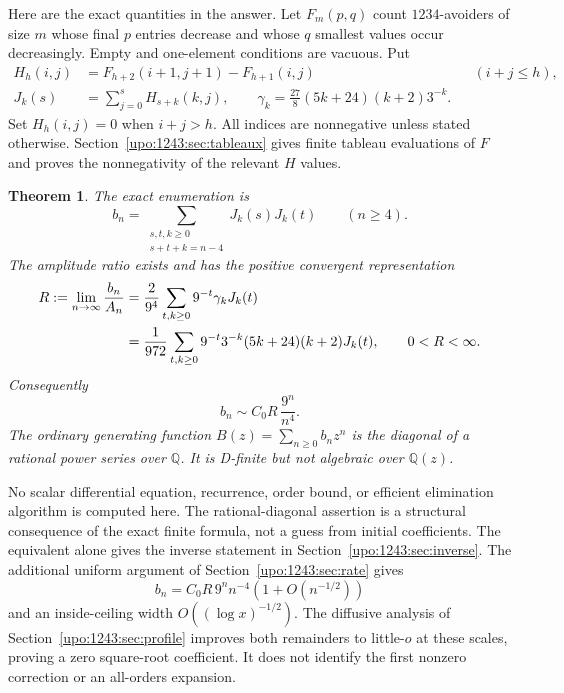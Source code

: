 \documentclass[11pt,letterpaper]{article}
\newtheorem{theorem}{Theorem}[section]
\theoremstyle{remark}\newtheorem{remark}[theorem]{Remark}
\numberwithin{equation}{section}
\begin{document}
Here are the exact quantities in the answer. Let $F_m(p,q)$ count
$1234$-avoiders of size $m$ whose final $p$ entries decrease and whose
$q$ smallest values occur decreasingly. Empty and one-element conditions
are vacuous. Put
\begin{align}
 H_h(i,j)&=F_{h+2}(i+1,j+1)-F_{h+1}(i,j)
       &&(i+j\le h),\label{upo:1243:eq:H}\\
 J_k(s)&=\sum_{j=0}^s H_{s+k}(k,j),\qquad
 \gamma_k=\frac{27}{8}(5k+24)(k+2)3^{-k}.\label{upo:1243:eq:Jdef}
\end{align}
Set $H_h(i,j)=0$ when $i+j>h$. All indices are nonnegative unless stated
otherwise. Section~\ref{upo:1243:sec:tableaux} gives finite tableau evaluations of
$F$ and proves the nonnegativity of the relevant $H$ values.

\begin{theorem}\label{upo:1243:thm:main}
The exact enumeration is
\begin{equation}\label{upo:1243:eq:spine}
 b_n=\sum_{\substack{s,t,k\ge0\\s+t+k=n-4}}J_k(s)J_k(t)
 \qquad(n\ge4).
\end{equation}
The amplitude ratio exists and has the positive convergent representation
\begin{align}
 R:=\lim_{n\to\infty}\frac{b_n}{A_n}
 &=\frac2{9^4}\sum_{t,k\ge0}9^{-t}\gamma_kJ_k(t)\label{upo:1243:eq:amplitude}\\
 &=\frac1{972}\sum_{t,k\ge0}9^{-t}3^{-k}(5k+24)(k+2)J_k(t),
 \qquad 0<R<\infty.\notag
\end{align}
Consequently
\begin{equation}\label{upo:1243:eq:main-equivalent}
 b_n\sim C_0R\,\frac{9^n}{n^4}.
\end{equation}
The ordinary generating function $B(z)=\sum_{n\ge0}b_nz^n$ is the
diagonal of a rational power series over $\mathbb Q$. It is D-finite
but not algebraic over $\mathbb Q(z)$.
\end{theorem}

No scalar differential equation, recurrence, order bound, or efficient
elimination algorithm is computed here. The rational-diagonal assertion
is a structural consequence of the exact finite formula, not a guess
from initial coefficients. The equivalent alone gives the inverse statement in
Section~\ref{upo:1243:sec:inverse}. The additional uniform argument of
Section~\ref{upo:1243:sec:rate} gives
\[
 b_n=C_0R\,9^n n^{-4}(1+O(n^{-1/2}))
\]
and an inside-ceiling width $O((\log x)^{-1/2})$. The diffusive analysis
of Section~\ref{upo:1243:sec:profile} improves both remainders to little-$o$ at
these scales, proving a zero square-root coefficient. It does not
identify the first nonzero correction or an all-orders expansion.
\end{document}
